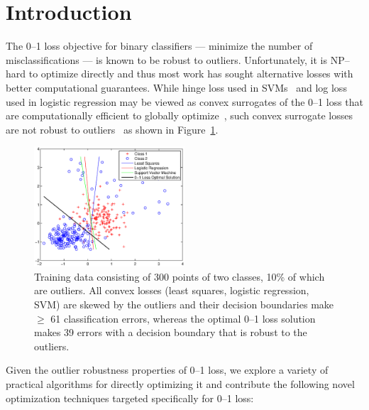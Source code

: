 \section{Introduction}
\label{cha:intro}

The 0--1 loss objective for binary classifiers --- minimize the number
of misclassifications --- is known to be robust to outliers.
Unfortunately, it is NP--hard to optimize directly
\cite{Feldman,nphard} and thus most work has sought alternative losses
with better computational guarantees.  While hinge loss used in
SVMs~\cite{Vapnik} and log loss used in logistic regression may be
viewed as convex surrogates of the 0--1 loss that are computationally
efficient to globally optimize~\cite{Bartlett}, such convex surrogate
losses are not robust to outliers~\cite{wu07,outliers,Ding} as
shown in Figure~\ref{fig:svm_failure}.

\begin{figure}[t!]
\vspace{-4mm}
\hspace{-3mm} \includegraphics[width=0.50\textwidth]{images/fig11_svm_failure2.eps}
\vspace{-9mm}
\caption{ \footnotesize Training data consisting of 300 points of two
  classes, 10\% of which are outliers.  All convex losses (least
  squares, logistic regression, SVM) are skewed by the outliers and
  their decision boundaries make $\geq$ 61 classification errors,
  whereas the optimal 0--1 loss solution makes 39 errors with a decision
  boundary that is robust to the outliers.}
\label{fig:svm_failure}
\vspace{-4mm}
\end{figure}

Given the outlier robustness properties of 0--1 loss, we explore a
variety of practical algorithms for directly optimizing it and
contribute the following novel optimization techniques targeted
specifically for 0--1 loss:

